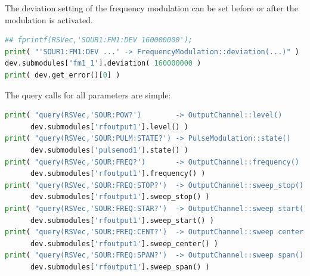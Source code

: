 \documentclass[11pt]{article} %
\begin{document}
The deviation setting of the frequency modulation can be set before or after the modulation is activated.
\begin{lstlisting}[frame=single, language=Python]
## fprintf(RSVec,'SOUR1:FM1:DEV 160000000');
print( "'SOUR1:FM1:DEV ...' -> FrequencyModulation::deviation(...)" )
dev.submodules['fm1_1'].deviation( 160000000 )
print( dev.get_error()[0] )
\end{lstlisting}

The query calls for all parameters are simple:
\begin{lstlisting}[frame=single, language=Python]
print( "query(RSVec,'SOUR:POW?')        -> OutputChannel::level()       ",
      dev.submodules['rfoutput1'].level() )
print( "query(RSVec,'SOUR:PULM:STATE?') -> PulseModulation::state()     ",
      dev.submodules['pulsemod1'].state() )
print( "query(RSVec,'SOUR:FREQ?')       -> OutputChannel::frequency()   ",
      dev.submodules['rfoutput1'].frequency() )
print( "query(RSVec,'SOUR:FREQ:STOP?')  -> OutputChannel::sweep_stop()  ",
      dev.submodules['rfoutput1'].sweep_stop() )
print( "query(RSVec,'SOUR:FREQ:STAR?')  -> OutputChannel::sweep start() ",
      dev.submodules['rfoutput1'].sweep_start() )
print( "query(RSVec,'SOUR:FREQ:CENT?')  -> OutputChannel::sweep center()",
      dev.submodules['rfoutput1'].sweep_center() )
print( "query(RSVec,'SOUR:FREQ:SPAN?')  -> OutputChannel::sweep span()  ",
      dev.submodules['rfoutput1'].sweep_span() )
\end{lstlisting}
\end{document}
